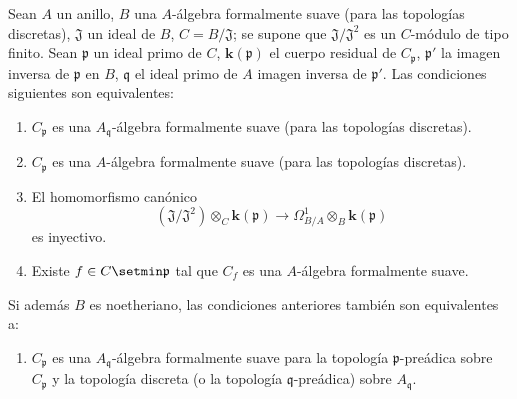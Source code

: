 \begin{proposition}[22.6.4]
\label{0.22.6.4-fr}
Sean $A$ un anillo, $B$ una $A$-álgebra formalmente suave (para las
topologías discretas), $\mathfrak J$ un ideal de $B$, $C=B/\mathfrak J$; se
supone que $\mathfrak J/\mathfrak J^2$ es un $C$-módulo de tipo finito. Sean
$\mathfrak p$ un ideal primo de $C$, $\boldsymbol{k}(\mathfrak p)$ el cuerpo residual de
$C_{\mathfrak p}$, $\mathfrak p'$ la imagen inversa de $\mathfrak p$ en
$B$, $\mathfrak q$ el ideal primo de $A$ imagen inversa de $\mathfrak p'$.
Las condiciones siguientes son equivalentes:
\begin{enumerate}
  \item[\textup{a)}] $C_{\mathfrak p}$ es una $A_{\mathfrak q}$-álgebra formalmente
  suave (para las topologías discretas).
  \item[\textup{a')}] $C_{\mathfrak p}$ es una $A$-álgebra formalmente suave (para
  las topologías discretas).
  \item[\textup{b)}] El homomorfismo canónico
  \begin{equation}
  \label{0.22.6.4.1-fr}
    (\mathfrak J/\mathfrak J^2)\otimes_C\boldsymbol{k}(\mathfrak p)
    \longrightarrow\Omega^1_{B/A}\otimes_B\boldsymbol{k}(\mathfrak p)
    \tag{22.6.4.1}
  \end{equation}
  es inyectivo.
  \item[\textup{c)}] Existe $f\in C\setmin\mathfrak p$ tal que $C_f$ es una
  $A$-álgebra formalmente suave.
\end{enumerate}
Si además $B$ es noetheriano, las condiciones anteriores también son
equivalentes a:
\begin{enumerate}
  \item[\textup{d)}] $C_{\mathfrak p}$ es una $A_{\mathfrak q}$-álgebra formalmente
  suave para la topología $\mathfrak p$-preádica sobre $C_{\mathfrak p}$ y la
  topología discreta (o la topología $\mathfrak q$-preádica) sobre
  $A_{\mathfrak q}$.
\end{enumerate}
\end{proposition}

